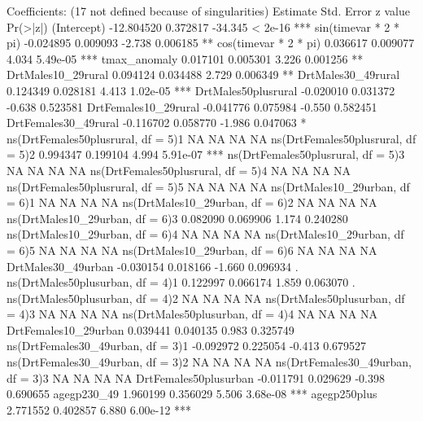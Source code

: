 \documentclass[a4paper]{article}                %
\begin{document}
\begin{Schunk}
\begin{Soutput}
Coefficients: (17 not defined because of singularities)
                                     Estimate Std. Error z value Pr(>|z|)    
(Intercept)                        -12.804520   0.372817 -34.345  < 2e-16 ***
sin(timevar * 2 * pi)               -0.024895   0.009093  -2.738 0.006185 ** 
cos(timevar * 2 * pi)                0.036617   0.009077   4.034 5.49e-05 ***
tmax_anomaly                         0.017101   0.005301   3.226 0.001256 ** 
DrtMales10_29rural                   0.094124   0.034488   2.729 0.006349 ** 
DrtMales30_49rural                   0.124349   0.028181   4.413 1.02e-05 ***
DrtMales50plusrural                 -0.020010   0.031372  -0.638 0.523581    
DrtFemales10_29rural                -0.041776   0.075984  -0.550 0.582451    
DrtFemales30_49rural                -0.116702   0.058770  -1.986 0.047063 *  
ns(DrtFemales50plusrural, df = 5)1         NA         NA      NA       NA    
ns(DrtFemales50plusrural, df = 5)2   0.994347   0.199104   4.994 5.91e-07 ***
ns(DrtFemales50plusrural, df = 5)3         NA         NA      NA       NA    
ns(DrtFemales50plusrural, df = 5)4         NA         NA      NA       NA    
ns(DrtFemales50plusrural, df = 5)5         NA         NA      NA       NA    
ns(DrtMales10_29urban, df = 6)1            NA         NA      NA       NA    
ns(DrtMales10_29urban, df = 6)2            NA         NA      NA       NA    
ns(DrtMales10_29urban, df = 6)3      0.082090   0.069906   1.174 0.240280    
ns(DrtMales10_29urban, df = 6)4            NA         NA      NA       NA    
ns(DrtMales10_29urban, df = 6)5            NA         NA      NA       NA    
ns(DrtMales10_29urban, df = 6)6            NA         NA      NA       NA    
DrtMales30_49urban                  -0.030154   0.018166  -1.660 0.096934 .  
ns(DrtMales50plusurban, df = 4)1     0.122997   0.066174   1.859 0.063070 .  
ns(DrtMales50plusurban, df = 4)2           NA         NA      NA       NA    
ns(DrtMales50plusurban, df = 4)3           NA         NA      NA       NA    
ns(DrtMales50plusurban, df = 4)4           NA         NA      NA       NA    
DrtFemales10_29urban                 0.039441   0.040135   0.983 0.325749    
ns(DrtFemales30_49urban, df = 3)1   -0.092972   0.225054  -0.413 0.679527    
ns(DrtFemales30_49urban, df = 3)2          NA         NA      NA       NA    
ns(DrtFemales30_49urban, df = 3)3          NA         NA      NA       NA    
DrtFemales50plusurban               -0.011791   0.029629  -0.398 0.690655    
agegp230_49                          1.960199   0.356029   5.506 3.68e-08 ***
agegp250plus                         2.771552   0.402857   6.880 6.00e-12 ***

\end{Soutput}
\end{Schunk}
\end{document}
